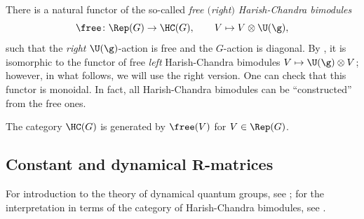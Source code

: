 	There is a natural functor of the so-called \emph{free $($right$)$ Harish-Chandra bimodules}
	\[
	\free \colon \Rep(G) \rightarrow \HC(G), \qquad V \mapsto V \otimes \U(\g),
	\]
	such that the \emph{right} $\U(\g)$-action is free and the $G$-action is diagonal. By \cite[equation~(28)]{KalmykovSafronov}, it is isomorphic to the functor of free \emph{left} Harish-Chandra bimodules $V \mapsto \U(\g) \otimes V$; however, in what follows, we will use the right version. One can check that this functor is monoidal. In fact, all Harish-Chandra bimodules can be ``constructed'' from the free ones.
	\begin{Proposition}
		\label{prop::hc_generators}
		The category $\HC(G)$ is generated by $\free(V)$ for $V \in \Rep(G)$.
	\end{Proposition}
	
	\subsection[Constant and dynamical R-matrices]{Constant and dynamical $\boldsymbol{R}$-matrices}
	\label{subsect::dynamica_r_mat}
	For introduction to the theory of dynamical quantum groups, see \cite{EtingofSchiffmann}; for the interpretation in terms of the category of Harish-Chandra bimodules, see \cite{KalmykovSafronov}.
	
